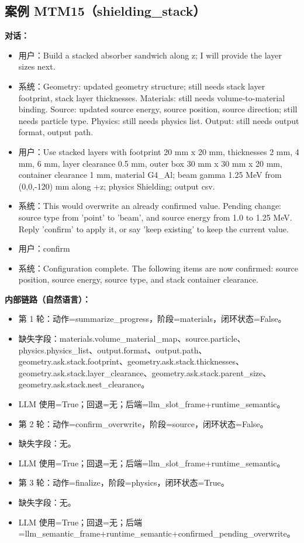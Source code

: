 \documentclass[11pt]{ctexart}
\begin{document}
\subsection{案例 MTM15（shielding\_stack）}
\textbf{对话：}
\begin{itemize}
\item 用户：Build a stacked absorber sandwich along z; I will provide the layer sizes next.
\item 系统：Geometry: updated geometry structure; still needs stack layer footprint, stack layer thicknesses. Materials: still needs volume-to-material binding. Source: updated source energy, source position, source direction; still needs particle type. Physics: still needs physics list. Output: still needs output format, output path.
\item 用户：Use stacked layers with footprint 20 mm x 20 mm, thicknesses 2 mm, 4 mm, 6 mm, layer clearance 0.5 mm, outer box 30 mm x 30 mm x 20 mm, container clearance 1 mm, material G4\_Al; beam gamma 1.25 MeV from (0,0,-120) mm along +z; physics Shielding; output csv.
\item 系统：This would overwrite an already confirmed value. Pending change: source type from 'point' to 'beam', and source energy from 1.0 to 1.25 MeV. Reply 'confirm' to apply it, or say 'keep existing' to keep the current value.
\item 用户：confirm
\item 系统：Configuration complete. The following items are now confirmed: source position, source energy, source type, and stack container clearance.
\end{itemize}
\textbf{内部链路（自然语言）：}
\begin{itemize}
\item 第 1 轮：动作=summarize\_progress，阶段=materials，闭环状态=False。
\item 缺失字段：materials.volume\_material\_map、source.particle、physics.physics\_list、output.format、output.path、geometry.ask.stack.footprint、geometry.ask.stack.thicknesses、geometry.ask.stack.layer\_clearance、geometry.ask.stack.parent\_size、geometry.ask.stack.nest\_clearance。
\item LLM 使用=True；回退=无；后端=llm\_slot\_frame+runtime\_semantic。
\item 第 2 轮：动作=confirm\_overwrite，阶段=source，闭环状态=False。
\item 缺失字段：无。
\item LLM 使用=True；回退=无；后端=llm\_slot\_frame+runtime\_semantic。
\item 第 3 轮：动作=finalize，阶段=physics，闭环状态=True。
\item 缺失字段：无。
\item LLM 使用=True；回退=无；后端=llm\_semantic\_frame+runtime\_semantic+confirmed\_pending\_overwrite。
\end{itemize}
\end{document}
